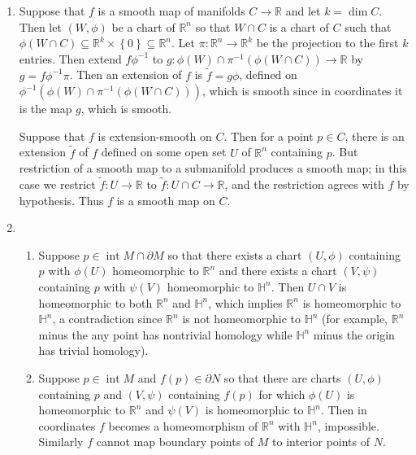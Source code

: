 \documentclass[11pt,leqno]{article}
\theoremstyle{plain}
\theoremstyle{definition}
\numberwithin{equation}{section}
\numberwithin{lem}{section}
\newcommand{\cbr}[1]{\left\{#1\right\}}
\DeclareMathOperator{\Int}{int}
\begin{document}
\begin{enumerate}
    \item Suppose that $f$ is a smooth map of manifolds $C\to\mathbb R$ and let $k = \dim C$. Then let $(W,\phi)$ be a chart of $\mathbb R^n$ so that $W\cap C$ is a chart of $C$ such that $\phi(W\cap C)\subseteq \mathbb R^k\times \cbr{0}\subseteq \mathbb R^n$. Let $\pi\colon \mathbb R^n\to\mathbb R^k$ be the projection to the first $k$ entries. Then extend $f\phi^{-1}$ to $g\colon \phi(W)\cap \pi^{-1}(\phi(W\cap C))\to \mathbb R$ by $g = f\phi^{-1}\pi$. Then an extension of $f$ is $\tilde f = g\phi$, defined on $\phi^{-1}(\phi(W)\cap \pi^{-1}(\phi(W\cap C)))$, which is smooth since in coordinates it is the map $g$, which is smooth. 
    
    Suppose that $f$ is extension-smooth on $C$. Then for a point $p\in C$, there is an extension $\tilde f$ of $f$ defined on some open set $U$ of $\mathbb R^n$ containing $p$. But restriction of a smooth map to a submanifold produces a smooth map; in this case we restrict $\tilde f\colon U\to \mathbb R$ to $\tilde f\colon U\cap C\to \mathbb R$, and the restriction agrees with $f$ by hypothesis. Thus $f$ is a smooth map on $C$.
    \item \begin{enumerate}
        \item Suppose $p\in\Int M\cap \partial M$ so that there exists a chart $(U,\phi)$ containing $p$ with $\phi(U)$ homeomorphic to $\mathbb R^n$ and there exists a chart $(V,\psi)$ containing $p$ with $\psi(V)$ homeomorphic to $\mathbb H^n$. Then $U\cap V$ is homeomorphic to both $\mathbb R^n$ and $\mathbb H^n$, which implies $\mathbb R^n$ is homeomorphic to $\mathbb H^n$, a contradiction since $\mathbb R^n$ is not homeomorphic to $\mathbb H^n$ (for example, $\mathbb R^n$ minus the any point has nontrivial homology while $\mathbb H^n$ minus the origin has trivial homology).
        \item Suppose $p\in \Int M$ and $f(p)\in \partial N$ so that there are charts $(U,\phi)$ containing $p$ and $(V,\psi)$ containing $f(p)$ for which $\phi(U)$ is homeomorphic to $\mathbb R^n$ and $\psi(V)$ is homeomorphic to $\mathbb H^n$. Then in coordinates $f$ becomes a homeomorphism of $\mathbb R^n$ with $\mathbb H^n$, impossible. Similarly $f$ cannot map boundary points of $M$ to interior points of $N$.
        

\end{enumerate}
\end{enumerate}
\end{document}
